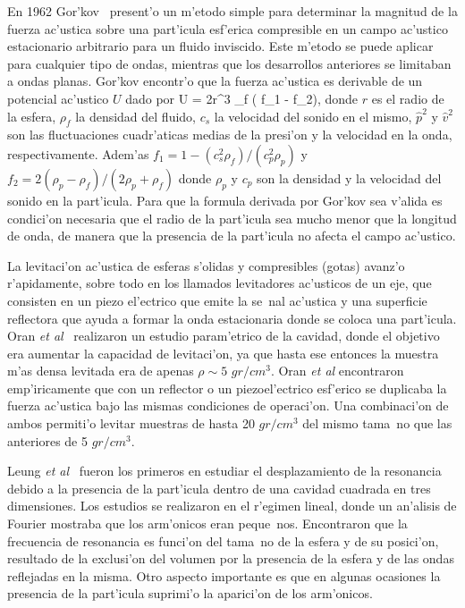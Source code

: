 En 1962  Gor'kov~\cite{gorkov62} present'o un m'etodo simple para 
determinar la magnitud de la fuerza ac'ustica sobre una part'icula esf'erica compresible en un campo
ac'ustico  estacionario arbitrario
para un fluido inviscido. Este m'etodo se puede aplicar para cualquier tipo de ondas, mientras
que los desarrollos anteriores se limitaban a ondas planas. Gor'kov encontr'o que la fuerza ac'ustica es derivable
de un potencial ac'ustico $U$ dado por
\BE\label{eq:gorkov}
U = 2\pi r^3 \rho_f \left(  f_1 - f_2\right),
\EE
donde $r$ es el radio de la esfera, $\rho_f$ la densidad del fluido, $c_s$ la velocidad del sonido en el mismo, 
${\hat p^2}$ y ${\hat v}^2$ son las fluctuaciones cuadr'aticas medias de la presi'on y la velocidad en la onda, 
respectivamente. Adem'as $f_1 = 1 - (c_s^2\rho_f)/(c_p^2\rho_p)$ y 
$f_2=2(\rho_p-\rho_f)/(2\rho_p + \rho_f)$ donde $\rho_p$ y $c_p$ son la densidad y la velocidad del sonido 
en la part'icula. Para que la formula derivada por Gor'kov sea v'alida es condici'on necesaria que el radio
de la part'icula sea mucho menor que la longitud de onda, de  manera que la presencia de la part'icula no afecta el 
campo ac'ustico.

La levitaci'on ac'ustica de esferas s'olidas y compresibles (gotas) avanz'o r'apidamente, sobre todo en 
los llamados levitadores ac'usticos de un eje, que consisten en un piezo el'ectrico que emite la se~nal
ac'ustica y una superficie reflectora  que ayuda a formar la onda estacionaria donde se
coloca una part'icula. 
Oran {\it et al}~\cite{oran80} realizaron un estudio param'etrico de la cavidad, donde el objetivo
era aumentar la capacidad de levitaci'on, ya que hasta ese entonces la muestra m'as densa levitada era de
apenas $\rho \sim 5$ $gr/cm^3$. Oran {\it et al} encontraron emp'iricamente que con un reflector o un
piezoel'ectrico esf'erico se  duplicaba la fuerza ac'ustica bajo las mismas condiciones de operaci'on. Una combinaci'on
de ambos permiti'o levitar muestras de hasta 20 $gr/cm^3$ del mismo tama~no que las anteriores de 5 $gr/cm^3$. 



Leung {\it et al}~\cite{leung82} fueron los primeros en estudiar el
desplazamiento de la resonancia debido a la presencia de la part'icula dentro de una cavidad cuadrada
en tres dimensiones. Los estudios se realizaron en el r'egimen lineal, donde un an'alisis de Fourier
mostraba que los arm'onicos eran peque~nos. Encontraron que la frecuencia de resonancia es funci'on del 
tama~no de la esfera y de su posici'on, resultado de la exclusi'on del volumen por la presencia de 
la esfera y de las ondas reflejadas en la misma.  Otro aspecto importante es que en algunas ocasiones
la presencia de la part'icula suprimi'o la aparici'on de los arm'onicos.

